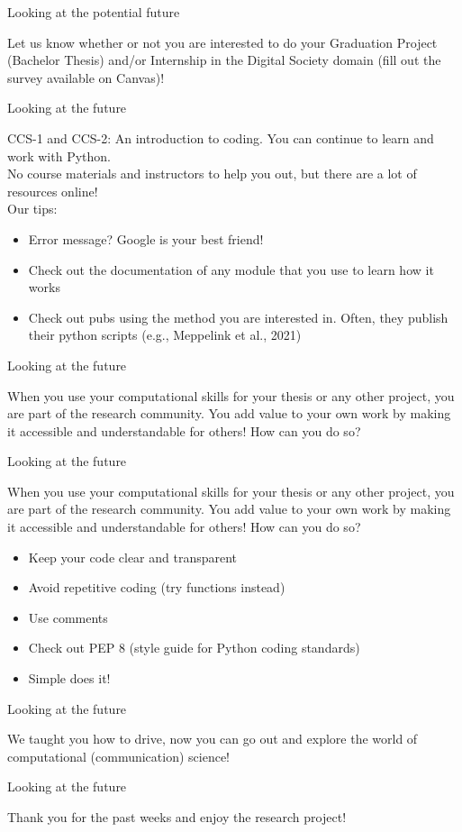 \documentclass[handout]{beamer}
\begin{document}
\begin{frame}{Looking at the potential future} 
	
Let us know whether or not you are interested to do your Graduation Project (Bachelor Thesis) and/or Internship in the Digital Society domain (fill out the survey available on Canvas)!

\end{frame}


\begin{frame}{Looking at the future} 
	
CCS-1 and CCS-2: An introduction to coding. You can continue to learn and work with Python.\\
No course materials and instructors to help you out, but there are a lot of resources online!\\
Our tips:
	\begin{itemize}
		\item Error message? Google is your best friend!
		\item Check out the documentation of any module that you use to learn how it works
		\item Check out pubs using the method you are interested in. Often, they publish their python scripts (e.g., Meppelink et al., 2021)
	\end{itemize}
	
\end{frame}


\begin{frame}{Looking at the future} 
	
When you use your computational skills for your thesis or any other project, you are part of the research community. You add value to your own work by making it accessible and understandable for others! How can you do so?
	
\end{frame}



\begin{frame}{Looking at the future} 
	
	When you use your computational skills for your thesis or any other project, you are part of the research community. You add value to your own work by making it accessible and understandable for others! How can you do so?
	\begin{itemize}
		\item Keep your code clear and transparent
		\item Avoid repetitive coding (try functions instead)
		\item Use comments 
		\item Check out PEP 8 (style guide for Python coding standards)
		\item Simple does it!
	\end{itemize}
	
\end{frame}


\begin{frame}{Looking at the future} 
	
We taught you how to drive, now you can go out and explore the world of computational (communication) science!
	
\end{frame}


\begin{frame}{Looking at the future} 
	
Thank you for the past weeks and enjoy the research project!

\end{frame}
\end{document}
